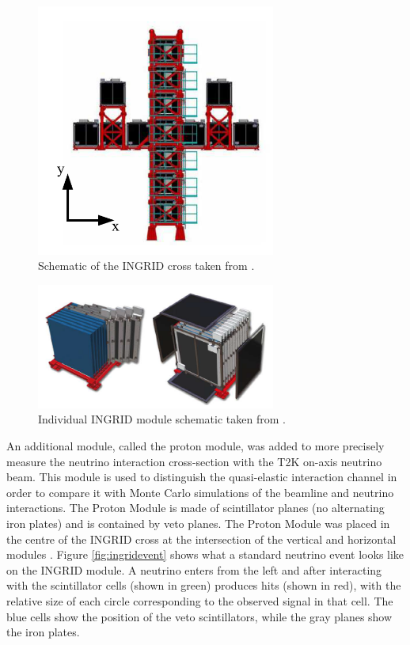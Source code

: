 \begin{figure}
    \centering
    \includegraphics[width=0.7\textwidth]{Figures/ingridcross.png}
    \caption{Schematic of the INGRID cross taken from \cite{t2k_collaboration_t2k_2013}.}
    \label{fig:ingridcross}
\end{figure}
\begin{figure}
    \centering
    \includegraphics[width=0.7\textwidth]{Figures/ingridmodule.png}
    \caption{Individual INGRID module schematic taken from \cite{t2k_collaboration_t2k_2013}.}
    \label{fig:ingridmodule}
\end{figure}

An additional module, called the proton module, was added to more precisely measure the neutrino interaction cross-section with the T2K on-axis neutrino beam. This module is used to distinguish the quasi-elastic interaction channel in order to compare it with Monte Carlo simulations of the beamline and neutrino interactions. The Proton Module is made of scintillator planes (no alternating iron plates) and is contained by veto planes. The Proton Module was placed in the centre of the INGRID cross at the intersection of the vertical and horizontal modules \cite{kikawa2012development}. Figure \ref{fig:ingridevent} shows what a standard neutrino event looks like on the INGRID module. A neutrino enters from the left and after interacting with the scintillator cells (shown in green) produces hits (shown in red), with the relative size of each circle corresponding to the observed signal in that cell. The blue cells show the position of the veto scintillators, while the gray planes show the iron plates.   


